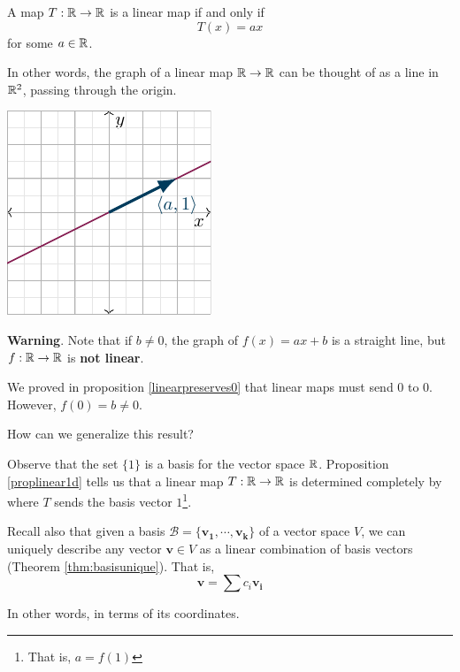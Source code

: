 \begin{theorem}\label{linear1d}
    A map $T: \mathbb{R} \to \mathbb{R}$ is a linear map if and only if $$T(x) = ax$$ for some $a \in \mathbb{R}$.
    \end{theorem}

In other words, the graph of a linear map $\mathbb{R} \to \mathbb{R}$ can be thought of as a line in $\mathbb{R}^2$, passing through the origin.

\begin{center}
    \includegraphics{chapters/1-LinearAlgebra/figures/figures-linearline.pdf}
\end{center}

\begin{remark}
    \textbf{Warning}.  Note that if $b\neq 0$, the graph of $f(x) = ax+b$ is a straight line, but $f : \mathbb{R} \to \mathbb{R}$ is \textbf{not linear}.

    We proved in proposition \ref{linearpreserves0} that linear maps must send 0 to 0.  However, $f(0) = b \neq 0$.
\end{remark}

    
    \begin{motivating}
    How can we generalize this result?
    \end{motivating}

    Observe that the set $\{1\}$ is a basis for the vector space $\mathbb{R}$.  Proposition \ref{proplinear1d} tells us that a linear map $T: \mathbb{R} \to \mathbb{R}$ is determined completely by where $T$ sends the basis vector $1$\footnote{That is, $a = f(1)$}.  
    
    Recall also that given a basis $\mathscr{B} = \{\bm{v_1}, \cdots, \bm{v_k}\}$ of a vector space $V$, we can uniquely describe any vector $\bm{v} \in V$ as a linear combination of basis vectors (Theorem \ref{thm:basisunique}).  That is, $$\bm{v} = \sum c_i \bm{v_i}$$
    
    In other words, in terms of its coordinates.
    
